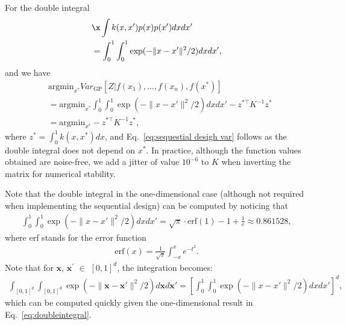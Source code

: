 For the double integral
\begin{align}
    & \x \int k(x,x')p(x)p(x')dxdx' \\
    & = \int_0^1 \int_0^1 \exp(-\|x - x'\|^2/2) dx dx', \\
\label{eq:double-integral}
\end{align}
and we have
\begin{align}
    & \mbox{argmin}_{x^*} Var_{\mbox{GP}}\left[Z | f(x_1), \ldots, f(x_n), f(x^*) \right]  \\
    & = \mbox{argmin}_{x^*}  \int_0^1 \int_0^1 \exp(-\|x - x'\|^2/2) dx dx' - z^{*\top}K^{-1}z^* \\
 & = \mbox{argmin}_{x^*}  - z^{*\top}K^{-1}z^*,
 \label{eq:sequestial desigh var}
\end{align}
where $z^* = \int_0^1 k(x, x^*) dx$, and Eq.~\eqref{eq:sequestial desigh var} follows as the double integral does not depend on $x^*$. In practice, although the function values obtained are noise-free, we add a jitter of value $10^{-6}$ to $K$ when inverting the matrix for numerical stability.

Note that the double integral in the one-dimensional case (although not required when implementing the sequential design) can be computed by noticing that \cite{wolframalpha}
\begin{align}
    \int_0^1 \int_0^1 \exp(-\|x - x'\|^2/2) dx dx'
    = \sqrt{\pi} \cdot \text{erf}(1) - 1 + \frac{1}{e} \approx 0.861528,
    \label{eq:doubleintegral}
\end{align}
where erf stands for the error function 
\begin{align}
    \text{erf}(x) = \frac{1}{\sqrt{\pi}}\int_{-x}^{x} e^{-t^2}.
\end{align}
Note that for $\pmb{x}$, $\pmb{x}^'$ $\in$ $[0,1]^d$, the integration becomes:
\begin{align}
    \int_{[0,1]^d}\int_{[0,1]^d}  \exp(-\| \pmb{x} - \pmb{x}' \|^2/2) d\pmb{x} d\pmb{x}' = \left[\int_0^1 \int_0^1 \exp(-\|x - x'\|^2/2) dx dx'\right] ^ d,
\end{align}
which can be computed quickly given the one-dimensional result in Eq.~\eqref{eq:doubleintegral}. 